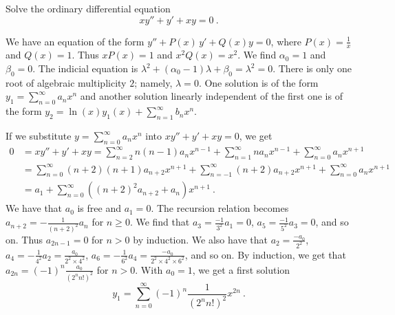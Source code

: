 \begin{egg}
Solve the ordinary differential equation
\[
xy''+  y' + x y = 0 \ .
\]

We have an equation of the form
$\displaystyle y'' + P(x)\, y' + Q(x) y = 0$, where
$\displaystyle P(x) = \frac{1}{x}$ and
$\displaystyle Q(x) = 1$.
Thus $\displaystyle x P(x) = 1$ and
$\displaystyle x^2 Q(x) = x^2$.  We find
$\alpha_0 = 1$ and $\beta_0= 0$.  The indicial equation is
$\displaystyle \lambda^2 + (\alpha_0 - 1)\lambda + \beta_0 = \lambda^2 = 0$.
There is only one root of algebraic multiplicity $2$; namely, $\lambda=0$.
One solution is of the form
$\displaystyle y_1 = \sum_{n=0}^\infty a_n x^n$ and another solution
linearly independent of the first one is of the form
$\displaystyle y_2 = \ln(x) y_1(x) + \sum_{n=1}^\infty b_n x^n$.

If we substitute $\displaystyle y = \sum_{n=0}^\infty a_n x^n$ into
$\displaystyle xy''+ y' + xy = 0$, we get
\begin{align*}
0 & = xy''+ y' + xy
= \sum_{n=2}^\infty n(n-1) a_n x^{n-1}
+ \sum_{n=1}^\infty n a_n x^{n-1} + \sum_{n=0}^\infty a_n x^{n+1} \\
&= \sum_{n=0}^\infty (n+2)(n+1) a_{n+2} x^{n+1}
+ \sum_{n=-1}^\infty (n+2)a_{n+2} x^{n+1}
+ \sum_{n=0}^\infty a_n x^{n+1} \\
&= a_1 + \sum_{n=0}^\infty \left( (n+2)^2 a_{n+2} +a_n\right) x^{n+1} \  .
\end{align*}
We have that $a_0$ is free and $a_1=0$.  The recursion relation becomes
$\displaystyle a_{n+2} = -\frac{1}{(n+2)^2} a_n$
for $n \geq 0$.  We find that
$\displaystyle a_3 = \frac{-1}{3^2} a_1 = 0$,
$\displaystyle a_5 = \frac{-1}{5^2} a_3 = 0$, and so on.
Thus $a_{2n-1} = 0 $ for $n>0$ by induction.  We also have that
$\displaystyle a_2 = \frac{-a_0}{2^2}$,
$\displaystyle a_4 = -\frac{1}{4^2}a_2 = \frac{a_0}{2^2\times 4^2}$,
$\displaystyle a_6 = -\frac{1}{6^2}a_4
= \frac{-a_0}{2^2\times 4^2\times 6^2}$, and so on.
By induction, we get that
$\displaystyle a_{2n} = (-1)^n \frac{a_0}{(2^n n!)^2}$
for $n>0$.   With $a_0=1$, we get a first solution
\[
y_1 = \sum_{n=0}^\infty (-1)^n \frac{1}{ (2^n n!)^2}x^{2n} \ .
\]


\end{egg}
